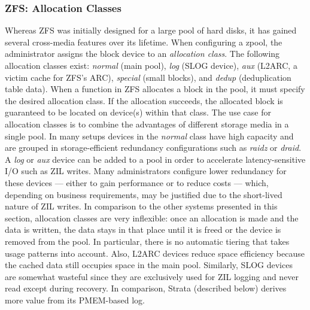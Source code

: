 \documentclass[12pt,a4paper,twoside,draft]{book}
\begin{document}
\subsubsection{ZFS: Allocation Classes}
Whereas ZFS was initially designed for a large pool of hard disks, it has gained several cross-media features over its lifetime.
When configuring a zpool, the administrator assigns the block device to an \textit{allocation class}.
The following allocation classes exist: \textit{normal} (main pool), \textit{log} (SLOG device), \textit{aux} (L2ARC, a victim cache for ZFS's ARC), \textit{special} (small blocks), and \textit{dedup} (deduplication table data).
When a function in ZFS allocates a block in the pool, it must specify the desired allocation class.
If the allocation succeeds, the allocated block is guaranteed to be located on device(s) within that class.
The use case for allocation classes is to combine the advantages of different storage media in a single pool.
In many setups devices in the \textit{normal} class have high capacity and are grouped in storage-efficient redundancy configurations such as \textit{raidz} or \textit{draid}.
A \textit{log} or \textit{aux} device can be added to a pool in order to accelerate latency-sensitive I/O such as ZIL writes.
Many administrators configure lower redundancy for these devices --- either to gain performance or to reduce costs --- which, depending on business requirements, may be justified due to the short-lived nature of ZIL writes.
In comparison to the other systems presented in this section, allocation classes are very inflexible:
once an allocation is made and the data is written, the data stays in that place until it is freed or the device is removed from the pool.
In particular, there is no automatic tiering that takes usage patterns into account.
Also, L2ARC devices reduce space efficiency because the cached data still occupies space in the main pool.
Similarly, SLOG devices are somewhat wasteful since they are exclusively used for ZIL logging and never read except during recovery.
In comparison, Strata (described below) derives more value from its PMEM-based log.
\end{document}
